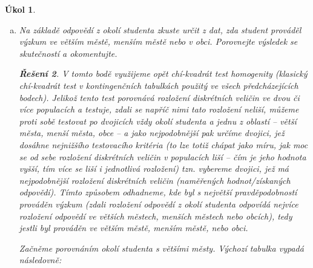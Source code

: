 \documentclass[11pt, a4paper]{article}
\theoremstyle{result}
\newtheorem*{result}{Řešení}
\newtheorem{task}{Úkol}
\begin{document}
\begin{task}
\begin{enumerate}[a)]
\begin{result}
            Všechny teoretické četnosti splňují podmínku $\frac{n_{i, \bullet} \cdot n_{\bullet, j}}{n} > 5; \forall i,j$, přejděme k výpočtu testovacího kritéria:
            $$t = n \sum_{i=1}^{r} \sum_{j=1}^{c} \frac{n_{i, j}^2}{n_{i, \bullet} \cdot n_{\bullet, j}} - n = 23.7406$$

            Doplněk kritického oboru je pak stejný jako v bodě \ref{1d}), tedy:
            $$\overline{W}_{0.05} = \langle 0, \chi_{0.95}^2(2) \rangle = \langle 0, 5.991 \rangle$$

            Vidíme, že $t \notin \overline{W}_{0.05}$, a proto se $H_0$ \textbf{zamítá}. U větších měst, menších měst a obcí tedy dle testu stejné procentuální zastoupení nerozhodnutých obyvatel není.
        \end{result}
        
        \item Na základě odpovědí z okolí studenta zkuste určit z dat, zda student prováděl výzkum ve větším městě, menším městě nebo v obci. Porovnejte výsledek se skutečností a okomentujte.

        \begin{result}
            V tomto bodě využijeme opět chí-kvadrát test homogenity (klasický chí-kvadrát test v kontingenčních tabulkách použitý ve všech předcházejících bodech). Jelikož tento test porovnává rozložení diskrétních veličin ve dvou či více populacích a testuje, zdali se napříč nimi tato rozložení neliší, můžeme proti sobě testovat po dvojicích vždy \textit{okolí studenta} a jednu z oblastí -- \textit{větší města}, \textit{menší města}, \textit{obce} -- a jako nejpodobnější pak určíme dvojici, jež dosáhne nejnižšího testovacího kritéria (to lze totiž chápat jako míru, jak moc se od sebe rozložení diskrétních veličin v populacích liší -- čím je jeho hodnota vyšší, tím více se liší i jednotlivá rozložení) tzn. vybereme dvojici, jež má nejpodobnější rozložení diskrétních veličin (naměřených hodnot/získaných odpovědí). Tímto způsobem odhadneme, kde byl s největší pravděpodobností prováděn výzkum (zdali rozložení odpovědí z \textit{okolí studenta} odpovídá nejvíce rozložení odpovědí ve \textit{větších městech}, \textit{menších městech} nebo \textit{obcích}), tedy jestli byl prováděn ve \textit{větším městě}, \textit{menším městě}, nebo \textit{obci}.

            Začněme porovnáním \textit{okolí studenta} s \textit{většími městy}. Výchozí tabulka vypadá následovně:


\end{result}
\end{enumerate}
\end{task}
\end{document}
